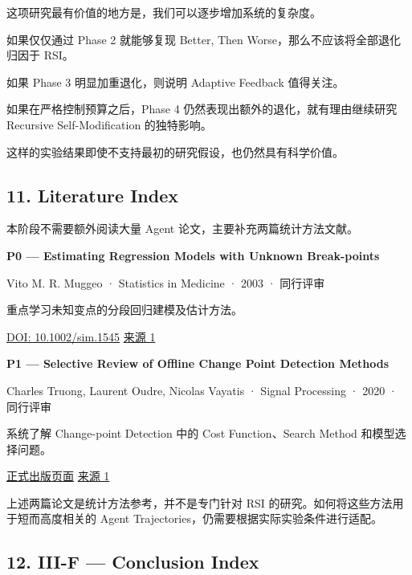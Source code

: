 这项研究最有价值的地方是，我们可以逐步增加系统的复杂度。

如果仅仅通过 Phase 2 就能够复现 Better, Then Worse，那么不应该将全部退化归因于 RSI。

如果 Phase 3 明显加重退化，则说明 Adaptive Feedback 值得关注。

如果在严格控制预算之后，Phase 4 仍然表现出额外的退化，就有理由继续研究 Recursive Self-Modification 的独特影响。

这样的实验结果即使不支持最初的研究假设，也仍然具有科学价值。

\hypertarget{part-3-48-0001-literature-index}{%
\subsection{11. Literature Index}\label{part-3-48-0001-literature-index}}

本阶段不需要额外阅读大量 Agent 论文，主要补充两篇统计方法文献。

\textbf{P0 --- Estimating Regression Models with Unknown Break-points}

Vito M. R. Muggeo · Statistics in Medicine · 2003 · 同行评审

重点学习未知变点的分段回归建模及估计方法。

\href{https://doi.org/10.1002/sim.1545}{DOI: 10.1002/sim.1545} \href{https://pubmed.ncbi.nlm.nih.gov/12973787/}{来源 1}

\textbf{P1 --- Selective Review of Offline Change Point Detection Methods}

Charles Truong, Laurent Oudre, Nicolas Vayatis · Signal Processing · 2020 · 同行评审

系统了解 Change-point Detection 中的 Cost Function、Search Method 和模型选择问题。

\href{https://www.sciencedirect.com/science/article/pii/S0165168419303494}{正式出版页面} \href{https://www.sciencedirect.com/science/article/pii/S0165168419303494}{来源 1}

上述两篇论文是统计方法参考，并不是专门针对 RSI 的研究。如何将这些方法用于短而高度相关的 Agent Trajectories，仍需要根据实际实验条件进行适配。

\hypertarget{part-3-48-0001-iii-f-conclusion-index}{%
\subsection{12. III-F --- Conclusion Index}\label{part-3-48-0001-iii-f-conclusion-index}}

